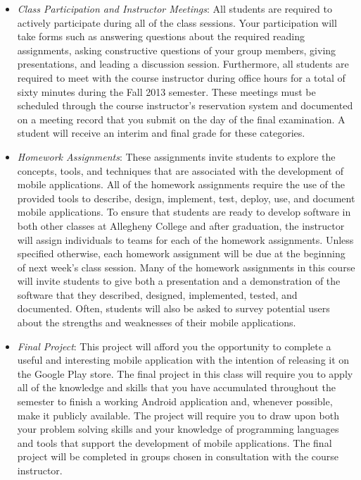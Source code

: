\begin{itemize}

	\item {\em Class Participation and Instructor Meetings}: All students are required to actively participate during
		all of the class sessions. Your participation will take forms such as answering questions about the required
		reading assignments, asking constructive questions of your group members, giving presentations, and leading a
		discussion session. Furthermore, all students are required to meet with the course instructor during office
		hours for a total of sixty minutes during the Fall 2013 semester.  These meetings must be scheduled through the
		course instructor's reservation system and documented on a meeting record that you submit on the day of the final
		examination. A student will receive an interim and final grade for these categories.

	\item {\em Homework Assignments}: These assignments invite students to explore the concepts, tools, and techniques
		that are associated with the development of mobile applications.  All of the homework assignments require the
		use of the provided tools to describe, design, implement, test, deploy, use, and document mobile applications.
		To ensure that students are ready to develop software in both other classes at Allegheny College and after
		graduation, the instructor will assign individuals to teams for each of the homework assignments.  Unless
		specified otherwise, each homework assignment will be due at the beginning of next week's class session.  Many of
		the homework assignments in this course will invite students to give both a presentation and a demonstration of
		the software that they described, designed, implemented, tested, and documented. Often, students will also be
		asked to survey potential users about the strengths and weaknesses of their mobile applications.
	
	\item {\em Final Project}: This project will afford you the opportunity to complete a useful and interesting mobile
		application with the intention of releasing it on the Google Play store.	The final project in this class will
		require you to apply all of the knowledge and skills that you have accumulated throughout the semester
		to finish a working Android application and, whenever possible, make it publicly available.  The project will
		require you to draw upon both your problem solving skills and your knowledge of programming languages and tools
		that support the development of mobile applications. The final project will be completed in groups chosen in
		consultation with the course instructor.
		
\end{itemize}

